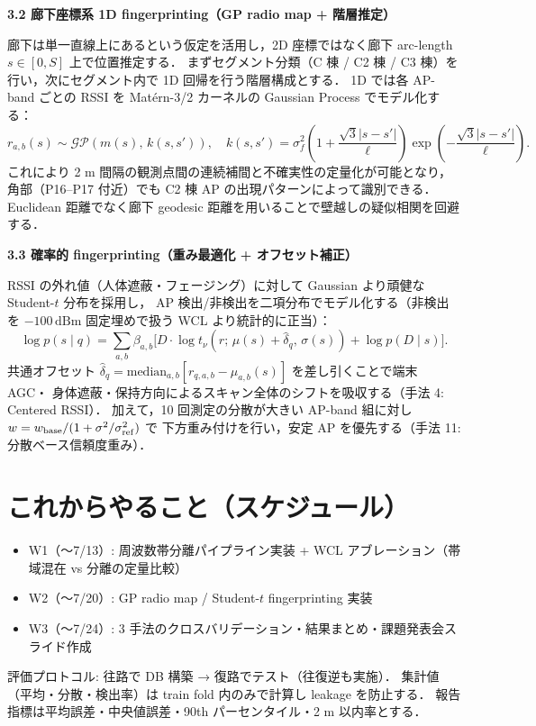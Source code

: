 \documentclass[a4paper]{ltjsarticle}
\begin{document}
\smallskip
\noindent\textbf{3.2 \; 廊下座標系 1D fingerprinting（GP radio map + 階層推定）}

廊下は単一直線上にあるという仮定を活用し，2D 座標ではなく廊下 arc-length $s\in[0,S]$ 上で位置推定する．
まずセグメント分類（C 棟 / C2 棟 / C3 棟）を行い，次にセグメント内で 1D 回帰を行う階層構成とする．
1D では各 AP-band ごとの RSSI を Matérn-3/2 カーネルの Gaussian Process でモデル化する：
\[
  r_{a,b}(s) \sim \mathcal{GP}(m(s),\,k(s,s')), \quad
  k(s,s') = \sigma_f^2\!\left(1+\frac{\sqrt{3}|s-s'|}{\ell}\right)\exp\!\left(-\frac{\sqrt{3}|s-s'|}{\ell}\right).
\]
これにより 2 m 間隔の観測点間の連続補間と不確実性の定量化が可能となり，
角部（P16–P17 付近）でも C2 棟 AP の出現パターンによって識別できる．
Euclidean 距離でなく廊下 geodesic 距離を用いることで壁越しの疑似相関を回避する．

\smallskip
\noindent\textbf{3.3 \; 確率的 fingerprinting（重み最適化 + オフセット補正）}

RSSI の外れ値（人体遮蔽・フェージング）に対して Gaussian より頑健な Student-$t$ 分布を採用し，
AP 検出/非検出を二項分布でモデル化する（非検出を $-100\,\mathrm{dBm}$ 固定埋めで扱う WCL より統計的に正当）：
\[
  \log p(s\mid q) = \sum_{a,b}\beta_{a,b}\bigl[D\cdot\log t_\nu(r;\,\mu(s)+\hat{\delta}_q,\,\sigma(s)) + \log p(D\mid s)\bigr].
\]
共通オフセット $\hat{\delta}_q = \mathrm{median}_{a,b}[r_{q,a,b}-\mu_{a,b}(s)]$ を差し引くことで端末 AGC・
身体遮蔽・保持方向によるスキャン全体のシフトを吸収する（手法 4: Centered RSSI）．
加えて，10 回測定の分散が大きい AP-band 組に対し $w = w_{\rm base}/(1+\sigma^2/\sigma_{\rm ref}^2)$ で
下方重み付けを行い，安定 AP を優先する（手法 11: 分散ベース信頼度重み）．

\section{これからやること（スケジュール）}

\begin{itemize}
  \item W1（〜7/13）: 周波数帯分離パイプライン実装 + WCL アブレーション（帯域混在 vs 分離の定量比較）
  \item W2（〜7/20）: GP radio map / Student-$t$ fingerprinting 実装
  \item W3（〜7/24）: 3 手法のクロスバリデーション・結果まとめ・課題発表会スライド作成
\end{itemize}

評価プロトコル: 往路で DB 構築 → 復路でテスト（往復逆も実施）．
集計値（平均・分散・検出率）は train fold 内のみで計算し leakage を防止する．
報告指標は平均誤差・中央値誤差・90th パーセンタイル・2 m 以内率とする．
\end{document}
